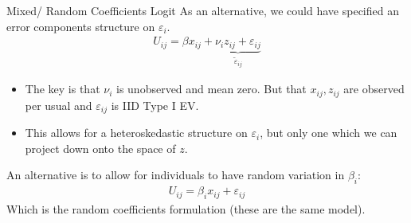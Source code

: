 \begin{frame}{Mixed/ Random Coefficients Logit}
\small
As an alternative, we could have specified an error components structure on $\varepsilon_i$.
\begin{eqnarray*}
U_{ij} = \beta x_{ij} + \underbrace{\nu_i z_{ij} + \varepsilon_{ij}}_{\tilde{\varepsilon}_{ij}}
\end{eqnarray*}
\begin{itemize}
\item The key is that $\nu_i$ is unobserved and mean zero. But that $x_{ij},z_{ij}$ are observed per usual and $\varepsilon_{ij}$ is IID Type I EV.
\item This allows for a heteroskedastic structure on $\varepsilon_{i}$, but only one which we can project down onto the space of $z$.
\end{itemize}
An alternative is to allow for individuals to have random variation in $\beta_i$:
\begin{eqnarray*}
U_{ij} = \beta_i x_{ij} +  \varepsilon_{ij}
\end{eqnarray*}
Which is the random coefficients formulation (these are the same model).
\end{frame}

%


